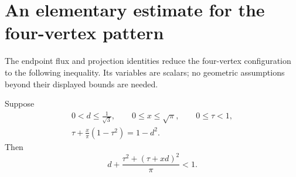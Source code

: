 \section{An elementary estimate for the four-vertex pattern}
\label{num:elementary-estimates}

The endpoint flux and projection identities reduce the four-vertex
configuration to the following inequality. Its variables are scalars;
no geometric assumptions beyond their displayed bounds are needed.

\begin{lemma}\label{num:four-vertex-scalar}
Suppose
\[
 \begin{gathered}
 0<d\le\frac1{\sqrt3},\qquad
 0\le x\le\sqrt\pi,\qquad 0\le\tau<1,\\
 \tau+\frac{x}{\pi}(1-\tau^2)=1-d^2.
 \end{gathered}
\]
Then
\[
 d+\frac{\tau^2+(\tau+xd)^2}{\pi}<1.
\]
\end{lemma}

